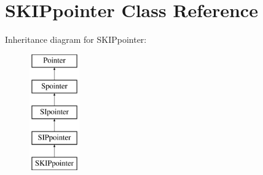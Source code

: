 \hypertarget{classSKIPpointer}{}\section{S\+K\+I\+Ppointer Class Reference}
\label{classSKIPpointer}
Inheritance diagram for S\+K\+I\+Ppointer\+:\begin{figure}[H]
\begin{center}
\leavevmode
\includegraphics[height=5.000000cm]{classSKIPpointer}
\end{center}
\end{figure}
